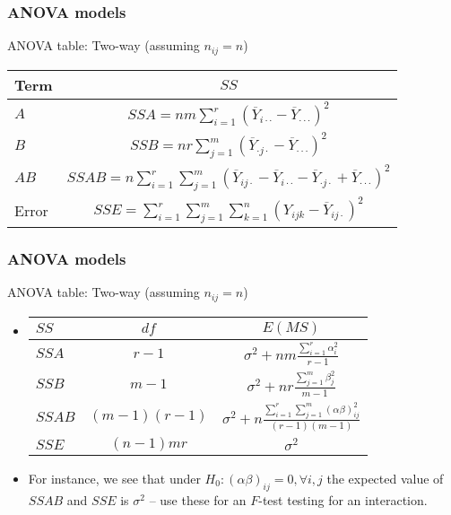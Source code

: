 \documentclass[handout]{beamer}
\begin{document}

   \begin{frame} \frametitle{ANOVA models}

   \begin{block}
   {ANOVA table: Two-way (assuming $n_{ij}=n$)}
   {\small
   \begin{tabular}{lc}
   Term & $SS$     \\ \hline
   $A$ &    $SSA = nm\sum_{i=1}^r  \left(\overline{Y}_{i\cdot\cdot} - \overline{Y}_{\cdot\cdot\cdot}\right)^2$ \\
   $B$ &     $SSB = nr\sum_{j=1}^m  \left(\overline{Y}_{\cdot j\cdot} - \overline{Y}_{\cdot\cdot\cdot}\right)^2$ \\
   $AB$ &    $SSAB = n\sum_{i=1}^r \sum_{j=1}^m  \left(\overline{Y}_{ij\cdot} - \overline{Y}_{i\cdot\cdot} - \overline{Y}_{\cdot j\cdot} + \overline{Y}_{\cdot\cdot\cdot}\right)^2$ \\
   Error &  $SSE = \sum_{i=1}^r \sum_{j=1}^m \sum_{k=1}^{n}(Y_{ijk} - \overline{Y}_{ij\cdot})^2$  \\
   \end{tabular}}
   \end{block}
   \end{frame}


   \begin{frame} \frametitle{ANOVA models}

   \begin{block}
   {ANOVA table: Two-way (assuming $n_{ij}=n$)}
   \begin{itemize}
   \item {\small
   \begin{tabular}{lcc}
   $SS$    & $df$ &  $E(MS)$ \\ \hline
   $SSA$ &   $r-1$     & $\sigma^2 + nm\frac{\sum_{i=1}^r \alpha_i^2}{r-1}$ \\
   $SSB$ &   $m-1$     & $\sigma^2 + nr\frac{\sum_{j=1}^m \beta_j^2}{m-1}$ \\
   $SSAB$ &   $(m-1)(r-1)$     & $\sigma^2 + n\frac{\sum_{i=1}^r\sum_{j=1}^m (\alpha\beta)_{ij}^2}{(r-1)(m-1)}$ \\
   $SSE$ & $(n-1)mr$ & $\sigma^2$ \\
   \end{tabular}}
   \item For instance, we see that under $H_0:(\alpha\beta)_{ij}=0, \forall i,j$
   the expected value of $SSAB$ and $SSE$ is $\sigma^2$ -- use these for an $F$-test testing for an interaction.
   \end{itemize}
   \end{block}
   \end{frame}
\end{document}
